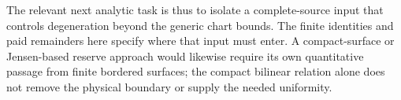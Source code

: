 The relevant next analytic task is thus to isolate a complete-source
input that controls degeneration beyond the generic chart bounds.
The finite identities and paid remainders here specify where that input
must enter. A compact-surface or Jensen-based reserve approach would
likewise require its own quantitative passage from finite bordered
surfaces; the compact bilinear relation alone does not remove the
physical boundary or supply the needed uniformity.
